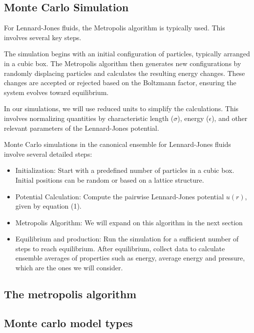 \documentclass[a4paper,12pt]{article}
\begin{document}
\subsection{Monte Carlo Simulation}
For Lennard-Jones fluids, the Metropolis algorithm is typically used. This involves several key steps.
\begin{multicols}{2}
     The simulation begins with an initial configuration of particles, typically arranged in a cubic box. The Metropolis algorithm then generates new configurations by randomly displacing particles and calculates the resulting energy changes. These changes are accepted or rejected based on the Boltzmann factor, ensuring the system evolves toward equilibrium.

In our simulations, we will use reduced units to simplify the calculations. This involves normalizing quantities by characteristic length ($\sigma$), energy ($\epsilon$), and other relevant parameters of the Lennard-Jones potential\cite{NIST_LJ_Fluid}.

Monte Carlo simulations in the canonical ensemble  for Lennard-Jones fluids involve several detailed steps:
\begin{itemize}
    \item Initialization: Start with a predefined number of particles in a cubic box. Initial positions can be random or based on a lattice structure.
\item Potential Calculation: Compute the pairwise Lennard-Jones potential   $u(r)$, given by equation (1).
\item Metropolis Algorithm: We will expand on this algorithm in the next section 
\item Equilibrium and production: Run the simulation for a sufficient number of steps to reach equilibrium. After equilibrium, collect data to calculate ensemble averages of properties such as energy, average energy and pressure, which are the ones we will consider. 

\end{itemize}

\end{multicols}

\subsection{ The metropolis algorithm}


\subsection{Monte carlo model types}
\end{document}
